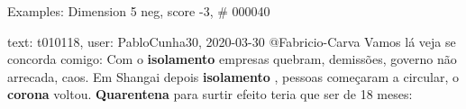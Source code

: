 \begin{frame}{Examples: Dimension 5 neg, score -3, \# 000040}
\footnotesize
\begin{alertblock}{text: t010118, user: PabloCunha30, 2020-03-30}
@Fabricio-Carva Vamos lá veja se concorda comigo: Com o \textbf{isolamento} 
empresas quebram, demissões, governo não arrecada, caos. Em Shangai depois 
\textbf{isolamento} , pessoas começaram a circular, o \textbf{corona} voltou. 
\textbf{Quarentena} para surtir efeito teria que ser de 18 meses: 
\end{alertblock}
\end{frame}
